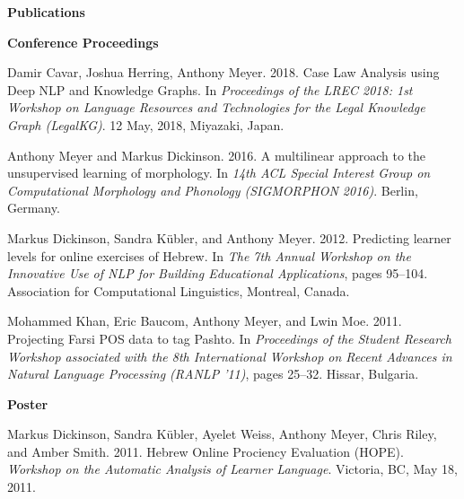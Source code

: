 \begin{singlespace}

%
\vspace{20pt}
\centerline{ \textbf{Publications}}
\vspace{10pt} 
\centerline{ \textbf{Conference Proceedings}}
\begin{description}
\item Damir Cavar, Joshua Herring, Anthony Meyer. 2018. Case Law Analysis using Deep NLP and Knowledge Graphs. 
In \emph{Proceedings of the LREC 2018: 1st Workshop on Language Resources and Technologies for the Legal Knowledge Graph (LegalKG)}. 12 May, 2018, Miyazaki, Japan.
\item Anthony Meyer and Markus Dickinson. 2016. A multilinear approach to the unsupervised
learning of morphology. In \emph{14th ACL Special Interest Group on Computational Morphology and
Phonology (SIGMORPHON 2016)}. Berlin, Germany.
\item Markus Dickinson, Sandra K\"{u}bler, and Anthony Meyer. 2012. Predicting learner levels for online
exercises of Hebrew. In \emph{The 7th Annual Workshop on the Innovative Use of NLP for Building
Educational Applications}, pages 95--104. Association for Computational Linguistics, Montreal,
Canada.
\item Mohammed Khan, Eric Baucom, Anthony Meyer, and Lwin Moe. 2011. Projecting Farsi POS
data to tag Pashto. In \emph{Proceedings of the Student Research Workshop associated with the 8th
International Workshop on Recent Advances in Natural Language Processing (RANLP '11)},
pages 25--32. Hissar, Bulgaria.
\end{description}
\vspace{-3pt}
\centerline{\textbf{Poster}} %
\begin{description}
\item Markus Dickinson, Sandra K\"{u}bler, Ayelet Weiss, Anthony Meyer, Chris Riley, and Amber Smith.
2011. Hebrew Online Prociency Evaluation (HOPE). \emph{Workshop on the Automatic Analysis of
Learner Language}. Victoria, BC, May 18, 2011.

\end{description}
\end{singlespace}
